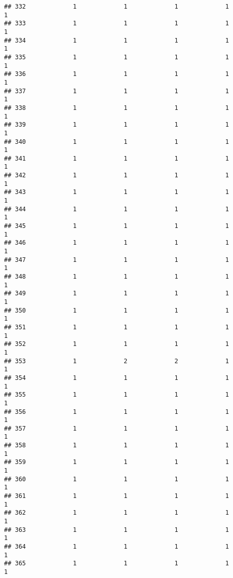 \documentclass[
]{article}
\begin{document}
\begin{verbatim}
## 332             1             1             1             1             1
## 333             1             1             1             1             1
## 334             1             1             1             1             1
## 335             1             1             1             1             1
## 336             1             1             1             1             1
## 337             1             1             1             1             1
## 338             1             1             1             1             1
## 339             1             1             1             1             1
## 340             1             1             1             1             1
## 341             1             1             1             1             1
## 342             1             1             1             1             1
## 343             1             1             1             1             1
## 344             1             1             1             1             1
## 345             1             1             1             1             1
## 346             1             1             1             1             1
## 347             1             1             1             1             1
## 348             1             1             1             1             1
## 349             1             1             1             1             1
## 350             1             1             1             1             1
## 351             1             1             1             1             1
## 352             1             1             1             1             1
## 353             1             2             2             1             1
## 354             1             1             1             1             1
## 355             1             1             1             1             1
## 356             1             1             1             1             1
## 357             1             1             1             1             1
## 358             1             1             1             1             1
## 359             1             1             1             1             1
## 360             1             1             1             1             1
## 361             1             1             1             1             1
## 362             1             1             1             1             1
## 363             1             1             1             1             1
## 364             1             1             1             1             1
## 365             1             1             1             1             1

\end{verbatim}
\end{document}
